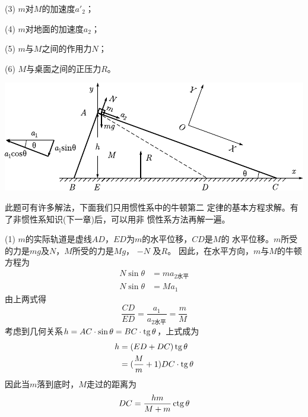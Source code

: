 (3) $ m $对$ M $的加速度$ a'_2 $；

(4) $ m $对地面的加速度$ a_2$；

(5) $ m $与$ M  $之间的作用力$  N $；

(6) $ M $与桌面之间的正压力$ R $。
\begin{figurex}
	\centering
	\includegraphics{figure/fig03.16}
	\caption{}
	\label{fig:03.16}
\end{figurex}

\solution 此题可有许多解法，下面我们只用惯性系中的牛顿第二
定律的基本方程求解。有了非惯性系知识(下一章)后，可以用非
惯性系方法再解一遍。

(1) $ m $的实际轨道是虚线$ AD $，$ ED $为$ m $的水平位移，$ CD $是$ M $的
水平位移。$ m $所受的力是$ mg $及$ N $，$ M $所受的力是$  M g  $， $ - N $ 及$ R $。
因此，在水平方向，$ m $与$ M $的牛顿方程为
\begin{align*}
    N \sin \theta &= m a _ { 2\text{水平} } \\
    N \sin \theta &= M a _ { 1 }
\end{align*}
由上两式得
\begin{equation*}
    \frac { C D } { E D } = \frac { a _ { 1 } } { a _ { 2\text{水平}}} = \frac { m } { M }
\end{equation*}
考虑到几何关系$  h = AC \cdot \sin \theta = BC \cdot \operatorname{tg} \theta  $，上式成为
\begin{align*}
    h &= ( E D + D C ) \operatorname{tg} \theta \\
    &= ( \frac { M } { m } + 1 ) D C \cdot \operatorname{tg} \theta
\end{align*}
因此当$ m $落到底时，$ M $走过的距离为
\begin{equation*}
    D C = \frac { h m } { M + m } \operatorname{ctg} \theta
\end{equation*}

